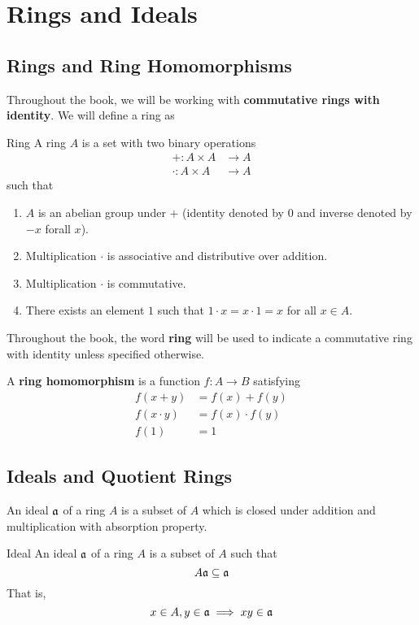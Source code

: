 \chapter{Rings and Ideals} \label{ch:rings-and-ideals}

\section{Rings and Ring Homomorphisms}
Throughout the book, we will be working with
\textbf{commutative rings with identity}.
We will define a ring as
\begin{definition}{Ring}{}
	A ring \( A \) is a set with two binary operations
	\begin{align*}
		+ : A \times A &\to A \\
		\cdot : A \times A &\to A
	\end{align*}
	such that
	\begin{enumerate}
		\item \( A \) is an abelian group under \( + \) (identity
		denoted by \( 0 \) and inverse denoted by \( -x \) forall \( x \)).
		\item Multiplication \( \cdot \) is associative and
		distributive over addition.
		\item Multiplication \( \cdot \) is commutative.
		\item There exists an element \( 1 \) such that
		\( 1 \cdot x = x \cdot 1 = x \) for all \( x \in A \).
	\end{enumerate}
\end{definition}

\begin{note}{}
	Throughout the book, the word \textbf{ring} will be used to
	indicate a commutative ring with identity unless specified otherwise.
\end{note}


\begin{defn}{}{}
	A \textbf{ring homomorphism} is a function \( f : A \to B \) satisfying
	\begin{align*}
		f(x + y) &= f(x) + f(y) \\
		f(x \cdot y) &= f(x) \cdot f(y) \\
		f(1) &= 1
	\end{align*}
\end{defn}


\section{Ideals and Quotient Rings}
An ideal \( \mathfrak{a} \) of a ring \( A \) is a subset of \( A \) which is closed
under addition and multiplication with absorption property.
\begin{defn}{Ideal}{}
	An ideal \( \mathfrak{a} \) of a ring \( A \) is a subset of \( A \) such that
	\[
		A\mathfrak{a} \subseteq \mathfrak{a}
	\]
	That is,
	\[
		x \in A, y \in \mathfrak{a} \implies xy \in \mathfrak{a}
	\]
\end{defn}

